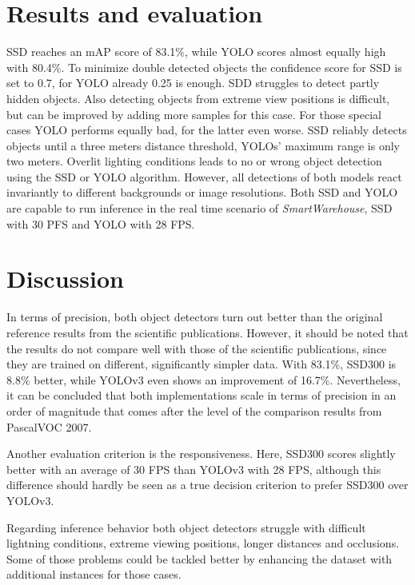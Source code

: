 \documentclass[a4paper, 10pt, journal]{wissarbIEEE}      %
\begin{document}
\section{Results and evaluation} \label{evaluation}

SSD reaches an mAP score of 83.1\%, while YOLO scores almost equally high with 80.4\%. To minimize double detected objects the confidence score for SSD is set to 0.7, for YOLO already 0.25 is enough. SDD struggles to detect partly hidden objects. Also detecting objects from extreme view positions is difficult, but can be improved by adding more samples for this case. For those special cases YOLO performs equally bad, for the latter even worse. SSD reliably detects objects until a three meters distance threshold, YOLOs' maximum range is only two meters. Overlit lighting conditions leads to no or wrong object detection using the SSD or YOLO algorithm. However, all detections of both models react invariantly to different backgrounds or image resolutions. Both SSD and YOLO are capable to run inference in the real time scenario of \textit{SmartWarehouse}, SSD with 30 PFS and YOLO with 28 FPS. 

\section{Discussion} \label{discussion}

In terms of precision, both object detectors turn out better than the original reference results from the scientific publications. However, it should be noted that the results do not compare well with those of the scientific publications, since they are trained on different, significantly simpler data. With 83.1\%, SSD300 is 8.8\% better, while YOLOv3 even shows an improvement of 16.7\%. Nevertheless, it can be concluded that both implementations scale in terms of precision in an order of magnitude that comes after the level of the comparison results from PascalVOC 2007.

Another evaluation criterion is the responsiveness. Here, SSD300 scores slightly better with an average of 30 FPS than YOLOv3 with 28 FPS, although this difference should hardly be seen as a true decision criterion to prefer SSD300 over YOLOv3.

Regarding inference behavior both object detectors struggle with difficult lightning conditions, extreme viewing positions, longer distances and occlusions. Some of those problems could be tackled better by enhancing the dataset with additional instances for those cases.
 
\end{document}
